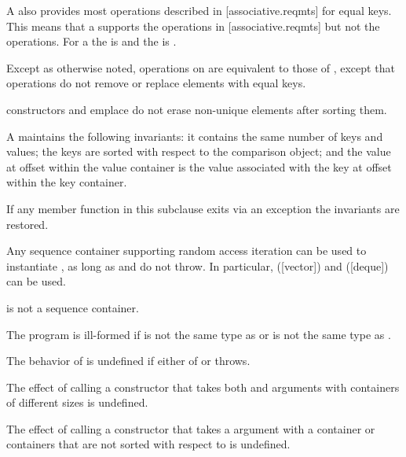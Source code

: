 \begin{addedblock}
\pnum
A  also provides most operations described
in [associative.reqmts] for equal keys.  This means that a
 supports the  operations
in [associative.reqmts] but not the  operations.  For
a  the  is  and the
 is .

\pnum
Except as otherwise noted, operations on  are equivalent
to those of , except that  operations do
not remove or replace elements with equal keys.  \begin{example}
constructors and emplace do not erase non-unique elements after sorting them.\end{example}

\pnum
A  maintains the following invariants: it contains the
same number of keys and values; the keys are sorted with respect to the
comparison object; and the value at offset  within the value
container is the value associated with the key at offset  within the
key container.

\pnum
If any member function in this subclause exits via an exception the invariants
are restored.

\pnum
Any sequence container  supporting random access iteration can be
used to instantiate , as long as 
and  do not throw. In particular, 
([vector]) and  ([deque]) can be
used.  \begin{note} is not a sequence container.\end{note}

\pnum
The program is ill-formed if  is not the same type
as  or
 is not the same type as .

\pnum
The behavior of  is undefined if either
of  or  throws.

\pnum
The effect of calling a constructor that takes both 
and  arguments with containers of different sizes is
undefined.

\pnum
The effect of calling a constructor that takes a 
argument with a container or containers that are not sorted with respect
to  is undefined.


\end{addedblock}
